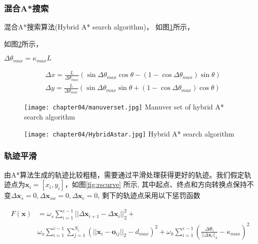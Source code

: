 \subsubsection{混合A*搜索}
混合A*搜索算法(Hybrid A* search algorithm)， 如图\ref{fig:manuverset}所示，


如图\ref{fig:HybridAstar}所示，



$\Delta \theta_{max}= \kappa_{max} L$


\begin{equation}
  \begin{aligned}
    & \Delta x = \frac{L}{\Delta \theta_{max}} 
    \left( \sin \Delta \theta_{max} \cos \theta - (1-\cos \Delta \theta_{max}) \sin \theta \right) \\
    & \Delta y = \frac{L}{\Delta \theta_{max}} 
    \left( \sin \Delta \theta_{max} \sin \theta + (1-\cos \Delta \theta_{max}) \cos \theta \right) 
  \end{aligned}
\end{equation}

\begin{figure}[!htp]
  \centering
  \texttt{[image: chapter04/manuverset.jpg]}
    {Manuver set of hybrid A* search algorithm}
  \label{fig:manuverset}
\end{figure}


\begin{figure}[!htp]
  \centering
  \texttt{[image: chapter04/HybridAstar.jpg]}
    {Hybrid A* search algorithm}
  \label{fig:HybridAstar}
\end{figure}

\subsubsection{轨迹平滑}
由A*算法生成的轨迹比较粗糙，需要通过平滑处理获得更好的轨迹。我们假定轨迹点为$\bm{x}_i=[x_i,y_i]$，如图\ref{fig:rscurve}
所示, 其中起点、终点和方向转换点保持不变$\Delta \bm{x}_{s}=0, \Delta \bm{x}_{sw}=0, \Delta \bm{x}_{e}=0$, 
剩下的轨迹点采用以下惩罚函数

\begin{equation} 
  \begin{aligned}
    F(\bm{x})
    &= \omega_s \sum_{i=1}^{e-1} ||\Delta \bm{x}_{i+1} - \Delta \bm{x}_{i}||_2^2 + \\
    &\omega_o \sum_{i=1}^{e-1} \sum_{j=1}^{N_i} \left( || \bm{x}_{i} - \bm{o}_{ij}||_2 - d_{max} \right)^2
     +\omega_k \sum_{i=1}^{e-1} 
     \left(\frac{\Delta \Phi_i }{|| \Delta \bm{x}_i ||_2} - \kappa_{max} \right)^2
  \end{aligned}
\end{equation}

